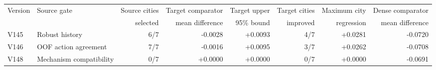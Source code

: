 \begin{tabular}{llrrrrrr}
\toprule
Version & Source gate & Source cities & Target comparator & Target upper & Target cities & Maximum city & Dense comparator \\
 &  & selected & mean difference & 95\% bound & improved & regression & mean difference \\
\midrule
V145 & Robust history & 6/7 & -0.0028 & +0.0093 & 4/7 & +0.0281 & -0.0720 \\
V146 & OOF action agreement & 7/7 & -0.0016 & +0.0095 & 3/7 & +0.0262 & -0.0708 \\
V148 & Mechanism compatibility & 0/7 & +0.0000 & +0.0000 & 0/7 & +0.0000 & -0.0691 \\
\bottomrule
\end{tabular}
